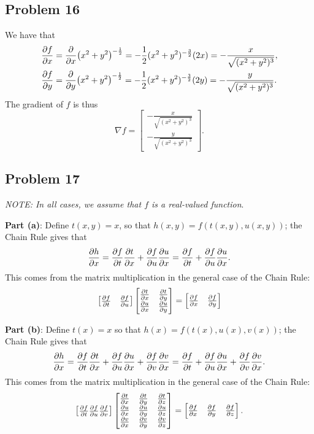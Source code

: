 \documentclass[11pt]{article}
\renewcommand{\grad}{\nabla}
\begin{document}

\subsection{Problem 16}

We have that
\begin{align*}
	\pdv{f}{x} &= \pdv{x} (x^{2} + y^{2})^{-\frac{1}{2}} = -\frac{1}{2} (x^{2} + y^{2})^{-\frac{3}{2}} (2x) = -\frac{x}{\sqrt{(x^{2} + y^{2})^{3}}}, \\
	\pdv{f}{y} &= \pdv{y} (x^{2} + y^{2})^{-\frac{1}{2}} = -\frac{1}{2} (x^{2} + y^{2})^{-\frac{3}{2}} (2y) = -\frac{y}{\sqrt{(x^{2} + y^{2})^{3}}}.
\end{align*}
The gradient of $f$ is thus
\[
	\grad f = \begin{bmatrix} -\frac{x}{\sqrt{(x^{2} + y^{2})^{3}}} \\ -\frac{y}{\sqrt{(x^{2} + y^{2})^{3}}} \end{bmatrix}.
\]


\subsection{Problem 17}

\textit{NOTE: In all cases, we assume that $f$ is a real-valued function}.

\textbf{Part (a)}: Define $t(x, y) = x$, so that $h(x, y) = f( t(x, y), u(x, y))$; the Chain Rule gives that
\[
	\pdv{h}{x} = \pdv{f}{t} \pdv{t}{x} + \pdv{f}{u} \pdv{u}{x} = \pdv{f}{t} + \pdv{f}{u} \pdv{u}{x}.
\]
This comes from the matrix multiplication in the general case of the Chain Rule:
\[
	\begin{bmatrix} \pdv{f}{t} & \pdv{f}{u} \end{bmatrix} \begin{bmatrix} \pdv{t}{x} & \pdv{t}{y} \\ \pdv{u}{x} & \pdv{u}{y} \end{bmatrix} = \begin{bmatrix} \pdv{f}{x} & \pdv{f}{y} \end{bmatrix}
\]

\textbf{Part (b)}: Define $t(x) = x$ so that $h(x) = f(t(x), u(x), v(x))$; the Chain Rule gives that
\[
	\pdv{h}{x} = \pdv{f}{t} \pdv{t}{x} + \pdv{f}{u} \pdv{u}{x} + \pdv{f}{v} \pdv{v}{x} = \pdv{f}{t} + \pdv{f}{u} \pdv{u}{x} + \pdv{f}{v} \pdv{v}{x}.
\]
This comes from the matrix multiplication in the general case of the Chain Rule:
\[
	\begin{bmatrix} \pdv{f}{t} \pdv{f}{u} \pdv{f}{v} \end{bmatrix} \begin{bmatrix} \pdv{t}{x} & \pdv{t}{y} & \pdv{t}{z} \\ \pdv{u}{x} & \pdv{u}{y} & \pdv{u}{z} \\ \pdv{v}{x} & \pdv{v}{y} & \pdv{v}{z} \end{bmatrix} = \begin{bmatrix} \pdv{f}{x} & \pdv{f}{y} & \pdv{f}{z} \end{bmatrix}.
\]
\end{document}

